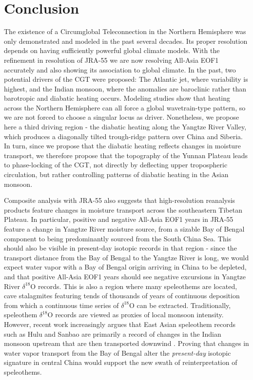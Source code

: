\section{Conclusion}

	The existence of a Circumglobal Teleconnection in the Northern Hemisphere was only demonstrated and modeled in the past several decades. Its proper resolution depends on having sufficiently powerful global climate models. With the refinement in resolution of JRA-55 we are now resolving All-Asia EOF1 accurately and also showing its association to global climate. In the past, two potential drivers of the CGT were proposed: The Atlantic jet, where variability is highest, and the Indian monsoon, where the anomalies are baroclinic rather than barotropic and diabatic heating occurs. Modeling studies show that heating across the Northern Hemisphere can all force a global wavetrain-type pattern, so we are not forced to choose a singular locus as driver. Nonetheless, we propose here a third driving region - the diabatic heating along the Yangtze River Valley, which produces a diagonally tilted trough-ridge pattern over China and Siberia. In turn, since we propose that the diabatic heating reflects changes in moisture transport, we therefore propose that the topography of the Yunnan Plateau leads to phase-locking of the CGT, not directly by deflecting upper tropospheric circulation, but rather controlling patterns of diabatic heating in the Asian monsoon.
	
	Composite analysis with JRA-55 also suggests that high-resolution reanalysis products feature changes in moisture transport across the southeastern Tibetan Plateau. In particular, positive and negative All-Asia EOF1 years in JRA-55 feature a change in Yangtze River moisture source, from a sizable Bay of Bengal component to being predominantly sourced from the South China Sea. This should also be visible in present-day isotopic records in that region - since the transport distance from the Bay of Bengal to the Yangtze River is long, we would expect water vapor with a Bay of Bengal origin arriving in China to be depleted, and that positive All-Asia EOF1 years should see negative excursions in Yangtze River $\delta ^{18}$O records. This is also a region where many speleothems are located, cave stalagmites featuring tends of thousands of years of continuous deposition from which a continuous time series of $\delta ^{18}$O can be extracted. Traditionally, speleothem $\delta ^{18}$O records are viewed as proxies of local monsoon intensity. However, recent work increasingly argues that East Asian speleothem records such as Hulu and Sanbao are primarily a record of changes in the Indian monsoon upstream that are then transported downwind \citep{Cai2015,Pausata2011,Baker2015}. Proving that changes in water vapor transport from the Bay of Bengal alter the \textit{present-day} isotopic signature in central China would support the new swath of reinterpretation of speleothems.

